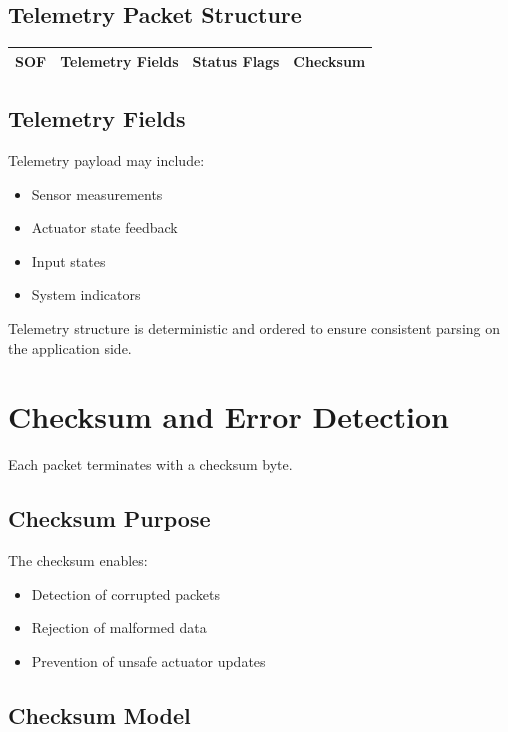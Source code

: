 \subsection{Telemetry Packet Structure}

\begin{center}
	\begin{tabular}{|c|c|c|c|}
		\hline
		SOF & Telemetry Fields & Status Flags & Checksum \\
		\hline
	\end{tabular}
\end{center}

\subsection{Telemetry Fields}

Telemetry payload may include:

\begin{itemize}
	\item Sensor measurements
	\item Actuator state feedback
	\item Input states
	\item System indicators
\end{itemize}

Telemetry structure is deterministic and ordered to ensure consistent parsing on the application side.


\section{Checksum and Error Detection}

Each packet terminates with a checksum byte.

\subsection{Checksum Purpose}

The checksum enables:

\begin{itemize}
	\item Detection of corrupted packets
	\item Rejection of malformed data
	\item Prevention of unsafe actuator updates
\end{itemize}

\subsection{Checksum Model}

